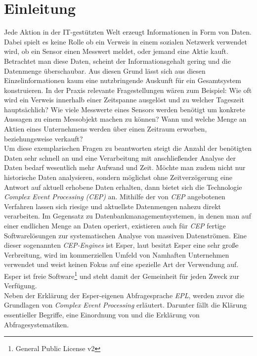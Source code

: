 \documentclass{acm_proc_article-sp}
\begin{document}
\section{Einleitung}
\vspace{0.1cm}
Jede Aktion in der IT-gestützten Welt erzeugt 
Informationen in Form von Daten. Dabei spielt es keine Rolle ob ein Verweis in einem 
sozialen Netzwerk verwendet wird, ob ein Sensor einen Messwert meldet, oder jemand eine 
Aktie kauft. Betrachtet man diese Daten, scheint der Informationsgehalt gering und die 
Datenmenge überschaubar. Aus diesen Grund lässt sich aus diesen Einzelinformationen kaum 
eine nutzbringende Auskunft für ein Gesamtsystem konstruieren. In der Praxis relevante
Fragestellungen wären zum Beispiel: Wie oft wird ein Verweis innerhalb einer Zeitspanne 
ausgelöst und zu welcher Tageszeit hauptsächlich? Wie viele Messwerte eines Sensors 
werden benötigt um konkrete Aussagen zu einem Messobjekt machen zu können? Wann und 
welche Menge an Aktien eines Unternehmens werden über einen Zeitraum erworben, 
beziehungsweise verkauft?\\
Um diese exemplarischen Fragen zu beantworten steigt die Anzahl der benötigten Daten sehr 
schnell an und eine Verarbeitung mit anschließender Analyse der Daten bedarf wesentlich 
mehr Aufwand und Zeit. Möchte man zudem nicht nur historische Daten analysieren, sondern 
möglichst ohne Zeitverzögerung eine Antwort auf aktuell erhobene Daten erhalten, dann 
bietet sich die Technologie \textit{Complex Event Processing (CEP)} an. Mithilfe der von 
\textit{CEP} angebotenen Verfahren lassen sich riesige und aktuellste Datenmengen nahezu 
direkt verarbeiten. Im Gegensatz zu Datenbankmanagementsystemen, in denen man auf einer 
endlichen Menge an Daten operiert, existieren auch für \textit{CEP} fertige 
Softwarelösungen zur systematischen Analyse von massiven Datenströmen. Eine dieser 
sogenannten \textit{CEP-Engines} ist Esper, laut \cite{fraunhofer} besitzt Esper eine 
sehr große Verbreitung, wird im kommerziellen Umfeld von Namhaften Unternehmen 
verwendet und weist keinen Fokus auf eine spezielle Art der Verwendung auf. Esper ist 
freie Software\footnote{General Public License v2} und steht damit der Gemeinheit für 
jeden Zweck zur Verfügung.\\
Neben der Erklärung der Esper-eigenen Abfragesprache \textit{EPL}, werden zuvor die 
Grundlagen von \textit{Complex Event Processing} erläutert. Darunter fällt die Klärung 
essentieller Begriffe, eine Einordnung von  und die Erklärung von 
Abfragesystematiken.
\end{document}
